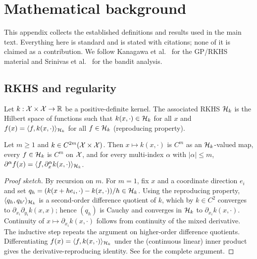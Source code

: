 \newpage
\section{Mathematical background}
\label{app:background}

This appendix collects the established definitions and results used in the main
text. Everything here is standard and is stated with citations; none of it is
claimed as a contribution. We follow Kanagawa et al.~\cite{kanagawa2018} for the
GP/RKHS material and Srinivas et al.~\cite{srinivas2010} for the bandit analysis.

\subsection{RKHS and regularity}

\begin{definition}[RKHS]
Let $k:\mathcal{X}\times\mathcal{X}\to\mathbb{R}$ be a positive-definite kernel. The associated RKHS $\mathcal{H}_k$
is the Hilbert space of functions such that $k(x,\cdot)\in\mathcal{H}_k$ for all $x$ and
$f(x)=\langle f, k(x,\cdot)\rangle_{\mathcal{H}_k}$ for all $f\in\mathcal{H}_k$ (reproducing property).
\end{definition}

\begin{theorem}
\label{app:thm-regtransfer}
Let $m\ge1$ and $k\in C^{2m}(\mathcal{X}\times\mathcal{X})$. Then $x\mapsto k(x,\cdot)$ is $C^m$ as
an $\mathcal{H}_k$-valued map, every $f\in\mathcal{H}_k$ is $C^m$ on $\mathcal{X}$, and for every multi-index
$\alpha$ with $|\alpha|\le m$,
$\partial^\alpha f(x)=\langle f, \partial_x^\alpha k(x,\cdot)\rangle_{\mathcal{H}_k}$.
\end{theorem}

\begin{proof}[Proof sketch]
By recursion on $m$. For $m=1$, fix $x$ and a coordinate direction $e_i$ and set
$q_h=(k(x+he_i,\cdot)-k(x,\cdot))/h\in\mathcal{H}_k$. Using the reproducing property,
$\langle q_h, q_{h'}\rangle_{\mathcal{H}_k}$ is a second-order difference quotient of $k$, which by
$k\in C^2$ converges to $\partial_{x_i}\partial_{y_i}k(x,x)$; hence $(q_h)$ is
Cauchy and converges in $\mathcal{H}_k$ to $\partial_{x_i}k(x,\cdot)$. Continuity of
$x\mapsto\partial_{x_i}k(x,\cdot)$ follows from continuity of the mixed
derivative. The inductive step repeats the argument on higher-order difference
quotients. Differentiating $f(x)=\langle f, k(x,\cdot)\rangle_{\mathcal{H}_k}$ under the (continuous
linear) inner product gives the derivative-reproducing identity. See
\cite{kanagawa2018} for the complete argument.
\end{proof}

